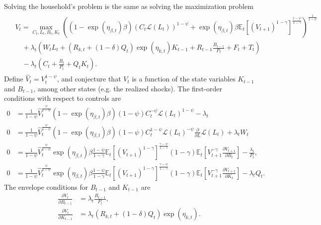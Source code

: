 \documentclass[12 pt, oneside]{article}
\theoremstyle{definition}
\theoremstyle{definition}
\theoremstyle{definition}
\newcommand{\E}{\mathbb{E}}
\newcommand{\calL}{\mathcal{L}}
\begin{document}
Solving the household's problem is the same as solving the maximization problem
\begin{align}
  \begin{split}
  &V_t = \max_{C_t, L_t, B_t, K_t} \left((1 - \exp(\eta_{\beta, t})\beta)\left(C_t \calL(L_t)\right)^{1 - \psi} + \exp(\eta_{\beta, t})\beta \E_t\left[\left(V_{t + 1}\right)^{1 - \gamma}\right]^{\frac{1 - \psi}{1 - \gamma}}\right)^{\frac{1}{1 - \psi}}\\
  & \quad + \lambda_t \left(W_t L_t + (R_{k, t} + (1 - \delta)Q_t)\exp(\eta_{k, t})K_{t - 1} + R_{t - 1} \frac{B_{t - 1}}{P_t} + F_t + T_t\right)\\
  &\quad - \lambda_t\left(C_t + \frac{B_t}{P_t} + Q_tK_t\right).
  \end{split}
\end{align}
Define $\hat{V}_t = V_t^{1 - \psi}$, and conjecture that $V_t$ is a function of the state variables $K_{t - 1}$ and $B_{t - 1}$, among other states (e.g. the realized shocks). The first-order conditions with respect to controls are
\begin{align*}
  0 & = \frac{1}{1 - \psi}\hat{V}_t^{\frac{\psi}{1 - \psi}} (1 - \exp(\eta_{\beta, t})\beta) (1 - \psi)C_t^{-\psi} \calL(L_t)^{1 - \psi} - \lambda_t\\
  0 & = \frac{1}{1 - \psi}\hat{V}_t^{\frac{\psi}{1 - \psi}}(1 - \exp(\eta_{\beta, t})\beta)(1 - \psi)C_t^{1 - \psi}\calL(L_t)^{-\psi}\frac{\partial}{\partial L}\calL(L_t) + \lambda_tW_t\\
  0 & = \frac{1}{1 - \psi}\hat{V}_t^{\frac{\psi}{1 - \psi}}\exp(\eta_{\beta, t})\beta \frac{1 - \psi}{1 - \gamma}\E_t[(V_{t + 1})^{1 - \gamma}]^{\frac{\gamma - \psi}{1 - \gamma}} (1 - \gamma)\E_t\left[V_{t + 1}^{ - \gamma}\frac{\partial V_{t + 1}}{\partial B_t}\right] - \frac{\lambda_t}{P_t},\\
  0 & = \frac{1}{1 - \psi}\hat{V}_t^{\frac{\psi}{1 - \psi}}\exp(\eta_{\beta, t})\beta \frac{1 - \psi}{1 - \gamma}\E_t[(V_{t + 1})^{1 - \gamma}]^{\frac{\gamma - \psi}{1 - \gamma}} (1 - \gamma)\E_t\left[V_{t + 1}^{ - \gamma}\frac{\partial V_{t + 1}}{\partial K_t}\right] - \lambda_t Q_t.
\end{align*}
The envelope conditions for  $B_{t - 1}$ and  $K_{t - 1}$ are
\begin{align*}
  \frac{\partial V_t}{\partial B_{t - 1}} & = \lambda_t\frac{R_{t - 1}}{P_t},\\
  \frac{\partial V_t}{\partial K_{t - 1}} & = \lambda_t(R_{k, t} + (1 - \delta)Q_t)\exp(\eta_{k, t}).
\end{align*}
\end{document}

